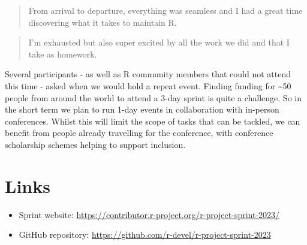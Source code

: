 \begin{quote}
From arrival to departure, everything was seamless and I had a great time discovering what it takes to maintain R.
\end{quote}

\begin{quote}
I'm exhausted but also super excited by all the work we did and that I take as homework.
\end{quote}

Several participants - as well as R community members that could not attend this time - asked when we would hold a repeat event. Finding funding for \textasciitilde50 people from around the world to attend a 3-day sprint is quite a challenge. So in the short term we plan to run 1-day events in collaboration with in-person conferences. Whilst this will limit the scope of tasks that can be tackled, we can benefit from people already travelling for the conference, with conference scholarship schemes helping to support inclusion.

\hypertarget{links}{%
\section{Links}\label{links}}

\begin{itemize}
\tightlist
\item
  Sprint website: \url{https://contributor.r-project.org/r-project-sprint-2023/}
\item
  GitHub repository: \url{https://github.com/r-devel/r-project-sprint-2023}
\end{itemize}


\address{%
Heather Turner\\
University of Warwick\\%
Coventry, United Kingdom\\
%
\url{https://warwick.ac.uk/heatherturner}\\%
\textit{ORCiD: \href{https://orcid.org/0000-0002-1256-3375}{0000-0002-1256-3375}}\\%
\href{mailto:h.turner.1@warwick.ac.uk}{\nolinkurl{h.turner.1@warwick.ac.uk}}%
}

\address{%
Gabriel Becker\\
Independent consultant\\%
San Francisco, USA\\
%
%
%
\href{mailto:gabembecker@gmail.com}{\nolinkurl{gabembecker@gmail.com}}%
}
